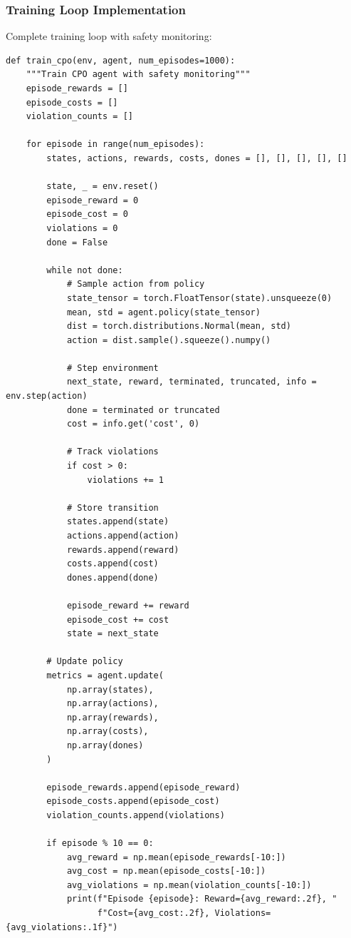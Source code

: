 \documentclass[12pt]{article}
\begin{document}
{{{{\subsubsection{Training Loop Implementation}

Complete training loop with safety monitoring:

\begin{verbatim}
def train_cpo(env, agent, num_episodes=1000):
    """Train CPO agent with safety monitoring"""
    episode_rewards = []
    episode_costs = []
    violation_counts = []

    for episode in range(num_episodes):
        states, actions, rewards, costs, dones = [], [], [], [], []
        
        state, _ = env.reset()
        episode_reward = 0
        episode_cost = 0
        violations = 0
        done = False

        while not done:
            # Sample action from policy
            state_tensor = torch.FloatTensor(state).unsqueeze(0)
            mean, std = agent.policy(state_tensor)
            dist = torch.distributions.Normal(mean, std)
            action = dist.sample().squeeze().numpy()

            # Step environment
            next_state, reward, terminated, truncated, info = env.step(action)
            done = terminated or truncated
            cost = info.get('cost', 0)
            
            # Track violations
            if cost > 0:
                violations += 1

            # Store transition
            states.append(state)
            actions.append(action)
            rewards.append(reward)
            costs.append(cost)
            dones.append(done)

            episode_reward += reward
            episode_cost += cost
            state = next_state

        # Update policy
        metrics = agent.update(
            np.array(states),
            np.array(actions),
            np.array(rewards),
            np.array(costs),
            np.array(dones)
        )

        episode_rewards.append(episode_reward)
        episode_costs.append(episode_cost)
        violation_counts.append(violations)

        if episode % 10 == 0:
            avg_reward = np.mean(episode_rewards[-10:])
            avg_cost = np.mean(episode_costs[-10:])
            avg_violations = np.mean(violation_counts[-10:])
            print(f"Episode {episode}: Reward={avg_reward:.2f}, "
                  f"Cost={avg_cost:.2f}, Violations={avg_violations:.1f}")


\end{verbatim}}}}}
\end{document}

